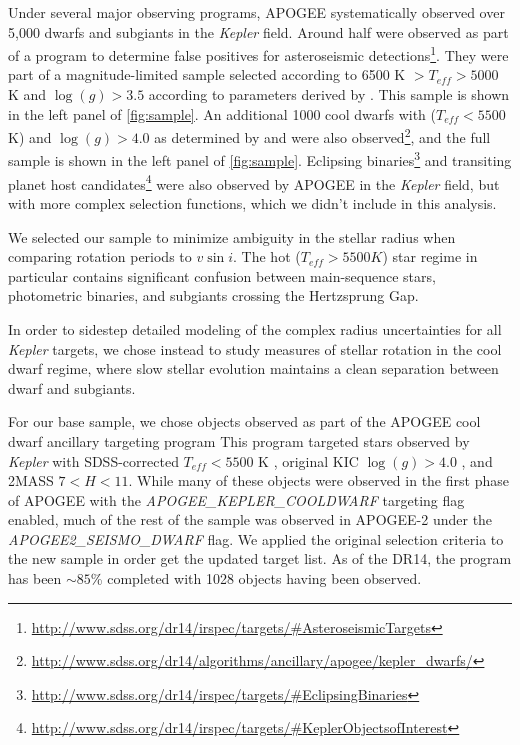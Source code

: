 \documentclass[manuscript]{aastex6}
\newcommand{\vsini}{\ensuremath{v \sin i}}
\newcommand{\Kepler}{\mbox{\textit{Kepler}}}
\newcommand{\Teff}{\ensuremath{T_{eff}}}
\newcommand{\logg}{\ensuremath{\log(g)}}
\begin{document}
Under several major observing programs, APOGEE systematically observed over 
5,000 dwarfs and subgiants in the \Kepler{} field. Around half were
observed as part of a program to determine false positives for
asteroseismic
detections\footnote{\url{http://www.sdss.org/dr14/irspec/targets/\#AsteroseismicTargets}}. 
They were part of a magnitude-limited sample
selected according to 6500 K \(> \Teff > 5000\) K and \(\logg > 3.5\)
according to parameters derived by \citet{Huber14} \citep{Zasowski17}.
This sample is shown in the left panel of \cref{fig:sample}. An additional 
1000 cool dwarfs with (\(\Teff < 5500\) K) and \(\logg > 4.0\) as determined
by \citet{Pinsonneault12} and \citet{Brown11} were also 
observed\footnote{\url{http://www.sdss.org/dr14/algorithms/ancillary/apogee/kepler_dwarfs/}}, 
and the full sample is shown in the left panel of \cref{fig:sample}. 
Eclipsing
binaries\footnote{\url{http://www.sdss.org/dr14/irspec/targets/\#EclipsingBinaries}} 
and transiting planet host 
candidates\footnote{\url{http://www.sdss.org/dr14/irspec/targets/\#KeplerObjectsofInterest}} 
were also observed 
by APOGEE in the \Kepler{} field, but with more complex selection functions, 
which we didn't include in this analysis.


We selected our sample to minimize ambiguity in the stellar radius when
comparing rotation periods to \vsini. The hot (\(\Teff > 5500 K\)) star regime
in particular contains significant confusion between main-sequence stars,
photometric binaries, and subgiants crossing the Hertzsprung Gap.

In order to sidestep detailed modeling of the complex radius uncertainties 
for all \Kepler{} targets, we chose instead to study measures of
stellar rotation in the cool dwarf regime, where
slow stellar evolution maintains a clean separation between dwarf and
subgiants. 

For our base sample, we chose objects observed as part of the APOGEE cool
dwarf ancillary targeting
program
This program targeted stars observed by \Kepler{} with SDSS-corrected
\(\Teff < 5500\) K \citep{Pinsonneault12}, original KIC \(\logg > 4.0\)
\citep{Brown11}, and 2MASS \(7 < H < 11\). While many of these objects
were observed in the first phase of APOGEE with the
\textit{APOGEE\_KEPLER\_COOLDWARF} targeting flag enabled, much of the rest of
the sample was observed in APOGEE-2 under the \textit{APOGEE2\_SEISMO\_DWARF}
flag. We applied the original selection criteria to the new sample in order get
the updated target list. As of the DR14, 
the program has been \(\sim 85\)\% completed with 1028 objects having been 
observed. 
\end{document}
